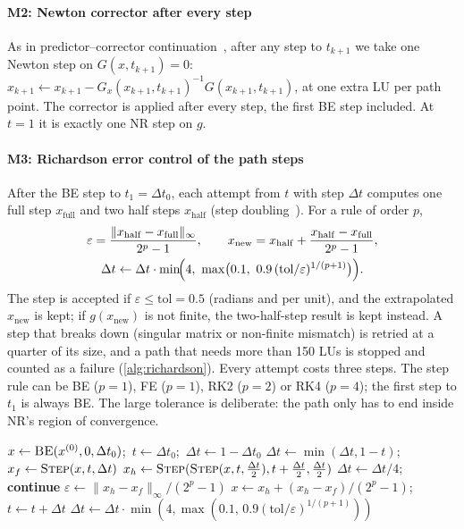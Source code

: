 \documentclass[sigconf,nonacm]{acmart}
\newcommand{\ninf}[1]{\lVert #1\rVert_\infty}
\newcommand{\xo}{x^{(0)}}
\begin{document}
\paragraph{M2: Newton corrector after every step}
As in predictor--corrector continuation~\cite{allgower2003}, after any step to $t_{k+1}$ we take one Newton
step on $G(x,t_{k+1})=0$: $x_{k+1}\gets x_{k+1}-G_x(x_{k+1},t_{k+1})^{-1}G(x_{k+1},t_{k+1})$, at one extra LU
per path point. The corrector is applied after every step, the first BE step included. At $t=1$ it is
exactly one NR step on $g$.

\paragraph{M3: Richardson error control of the path steps}
After the BE step to $t_1=\Delta t_0$, each attempt from $t$ with step $\Delta t$ computes one full step
$x_{\mathrm{full}}$ and two half steps $x_{\mathrm{half}}$ (step doubling~\cite{hairer1993}). For a rule of
order $p$,
\begin{gather}
  \varepsilon = \frac{\ninf{x_{\mathrm{half}}-x_{\mathrm{full}}}}{2^p-1}, \qquad
  x_{\mathrm{new}} = x_{\mathrm{half}} + \frac{x_{\mathrm{half}}-x_{\mathrm{full}}}{2^p-1}, \\
  \Delta t \gets \Delta t\cdot\min\!\Bigl(4,\ \max\bigl(0.1,\ 0.9\,(\mathrm{tol}/\varepsilon)^{1/(p+1)}\bigr)\Bigr).
\end{gather}
The step is accepted if $\varepsilon\le\mathrm{tol}=0.5$ (radians and per unit), and the extrapolated
$x_{\mathrm{new}}$ is kept; if $g(x_{\mathrm{new}})$ is not finite, the two-half-step result is kept
instead. A step that breaks down (singular matrix or non-finite mismatch) is retried at a quarter of its
size, and a path that needs more than 150 LUs is stopped and counted as a failure (\cref{alg:richardson}).
Every attempt costs three steps. The step rule can be BE ($p=1$), FE ($p=1$), RK2 ($p=2$) or RK4 ($p=4$);
the first step to $t_1$ is always BE. The large tolerance is deliberate: the path only has to end inside
NR's region of convergence.

\begin{algorithm}[t]
\caption{Richardson-controlled path}\label{alg:richardson}
\begin{algorithmic}[1]
\small
\State $x\gets\textsc{BE}(\xo,0,\Delta t_0)$;\ $t\gets\Delta t_0$;\ $\Delta t\gets 1-\Delta t_0$
  \State $\Delta t\gets\min(\Delta t,1-t)$;\ $x_f\gets\textsc{Step}(x,t,\Delta t)$
  \State $x_h\gets\textsc{Step}(\textsc{Step}(x,t,\tfrac{\Delta t}{2}),t+\tfrac{\Delta t}{2},\tfrac{\Delta t}{2})$
   $\Delta t\gets\Delta t/4$; \textbf{continue} \EndIf
  \State $\varepsilon\gets\ninf{x_h-x_f}/(2^p-1)$
   $x\gets x_h+(x_h-x_f)/(2^p-1)$; $t\gets t+\Delta t$ \EndIf
  \State $\Delta t\gets\Delta t\cdot\min(4,\max(0.1,\,0.9(\mathrm{tol}/\varepsilon)^{1/(p+1)}))$
\EndWhile
\end{algorithmic}
\end{algorithm}
\end{document}
